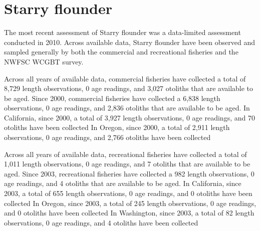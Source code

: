 \documentclass[11pt,
  english,
  letterpaper,
]{article}
\begin{document}

\hypertarget{starry-flounder}{%
\section{Starry flounder}\label{starry-flounder}}

\leavevmode\tagmcend\tagstructend


The most recent assessment of Starry flounder was a data-limited assessment conducted in 2010. Across available data, Starry flounder have been observed and sampled generally by both the commercial and recreational fisheries and the NWFSC WCGBT survey.

\leavevmode\tagmcend\tagstructend\par


Across all years of available data, commercial fisheries have collected a total of 8,729 length observations, 0 age readings, and 3,027 otoliths that are available to be aged. Since 2000, commercial fisheries have collected a 6,838 length observations, 0 age readings, and 2,836 otoliths that are available to be aged. In California, since 2000, a total of 3,927 length observations, 0 age readings, and 70 otoliths have been collected In Oregon, since 2000, a total of 2,911 length observations, 0 age readings, and 2,766 otoliths have been collected

\leavevmode\tagmcend\tagstructend\par


Across all years of available data, recreational fisheries have collected a total of 1,011 length observations, 0 age readings, and 7 otoliths that are available to be aged. Since 2003, recreational fisheries have collected a 982 length observations, 0 age readings, and 4 otoliths that are available to be aged. In California, since 2003, a total of 655 length observations, 0 age readings, and 0 otoliths have been collected In Oregon, since 2003, a total of 245 length observations, 0 age readings, and 0 otoliths have been collected In Washington, since 2003, a total of 82 length observations, 0 age readings, and 4 otoliths have been collected

\leavevmode\tagmcend\tagstructend\par
\end{document}
